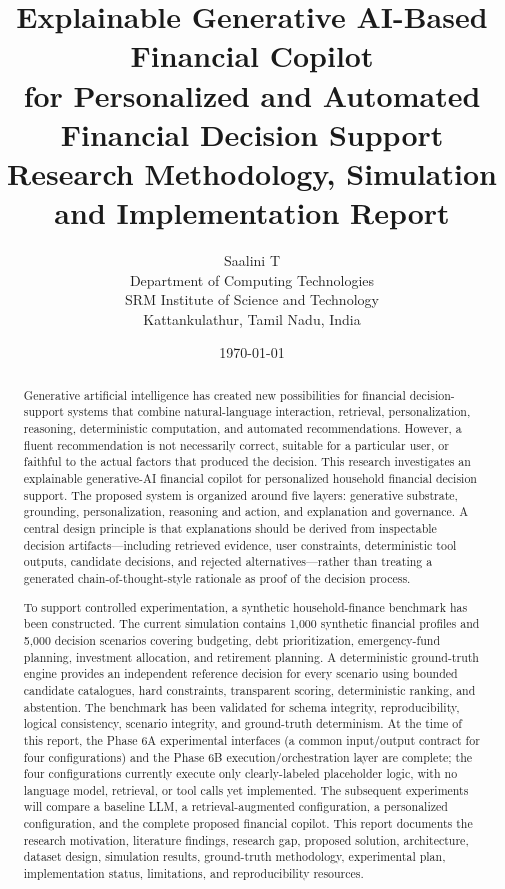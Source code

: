 \documentclass[12pt,a4paper]{article}
\title{
\textbf{Explainable Generative AI-Based Financial Copilot}\\
for Personalized and Automated Financial Decision Support\\[0.5em]
\large Research Methodology, Simulation and Implementation Report
}
\author{
Saalini T\\
Department of Computing Technologies\\
SRM Institute of Science and Technology\\
Kattankulathur, Tamil Nadu, India
}
\date{\today}
\begin{document}
\maketitle

\begin{abstract}
Generative artificial intelligence has created new possibilities for financial decision-support systems that combine natural-language interaction, retrieval, personalization, reasoning, deterministic computation, and automated recommendations. However, a fluent recommendation is not necessarily correct, suitable for a particular user, or faithful to the actual factors that produced the decision. This research investigates an explainable generative-AI financial copilot for personalized household financial decision support. The proposed system is organized around five layers: generative substrate, grounding, personalization, reasoning and action, and explanation and governance. A central design principle is that explanations should be derived from inspectable decision artifacts---including retrieved evidence, user constraints, deterministic tool outputs, candidate decisions, and rejected alternatives---rather than treating a generated chain-of-thought-style rationale as proof of the decision process.

To support controlled experimentation, a synthetic household-finance benchmark has been constructed. The current simulation contains 1,000 synthetic financial profiles and 5,000 decision scenarios covering budgeting, debt prioritization, emergency-fund planning, investment allocation, and retirement planning. A deterministic ground-truth engine provides an independent reference decision for every scenario using bounded candidate catalogues, hard constraints, transparent scoring, deterministic ranking, and abstention. The benchmark has been validated for schema integrity, reproducibility, logical consistency, scenario integrity, and ground-truth determinism. At the time of this report, the Phase 6A experimental interfaces (a common input/output contract for four configurations) and the Phase 6B execution/orchestration layer are complete; the four configurations currently execute only clearly-labeled placeholder logic, with no language model, retrieval, or tool calls yet implemented. The subsequent experiments will compare a baseline LLM, a retrieval-augmented configuration, a personalized configuration, and the complete proposed financial copilot. This report documents the research motivation, literature findings, research gap, proposed solution, architecture, dataset design, simulation results, ground-truth methodology, experimental plan, implementation status, limitations, and reproducibility resources.
\end{abstract}
\end{document}
